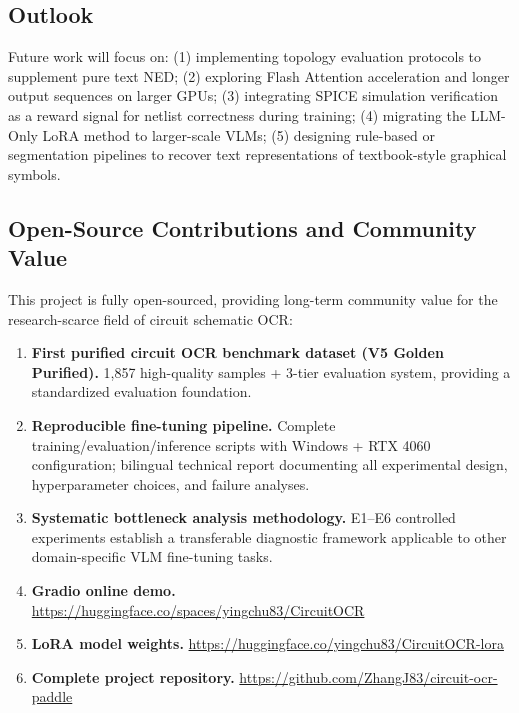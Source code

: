 \subsection{Outlook}

Future work will focus on: (1) implementing topology evaluation protocols to supplement pure text NED; (2) exploring Flash Attention acceleration and longer output sequences on larger GPUs; (3) integrating SPICE simulation verification as a reward signal for netlist correctness during training; (4) migrating the LLM-Only LoRA method to larger-scale VLMs; (5) designing rule-based or segmentation pipelines to recover text representations of textbook-style graphical symbols.

\subsection{Open-Source Contributions and Community Value}

This project is fully open-sourced, providing long-term community value for the research-scarce field of circuit schematic OCR:

\begin{enumerate}[nosep]
    \item \textbf{First purified circuit OCR benchmark dataset (V5 Golden Purified).} 1,857 high-quality samples + 3-tier evaluation system, providing a standardized evaluation foundation.
    \item \textbf{Reproducible fine-tuning pipeline.} Complete training/evaluation/inference scripts with Windows + RTX 4060 configuration; bilingual technical report documenting all experimental design, hyperparameter choices, and failure analyses.
    \item \textbf{Systematic bottleneck analysis methodology.} E1--E6 controlled experiments establish a transferable diagnostic framework applicable to other domain-specific VLM fine-tuning tasks.
    \item \textbf{Gradio online demo.} \url{https://huggingface.co/spaces/yingchu83/CircuitOCR}
    \item \textbf{LoRA model weights.} \url{https://huggingface.co/yingchu83/CircuitOCR-lora}
    \item \textbf{Complete project repository.} \url{https://github.com/ZhangJ83/circuit-ocr-paddle}
\end{enumerate}





